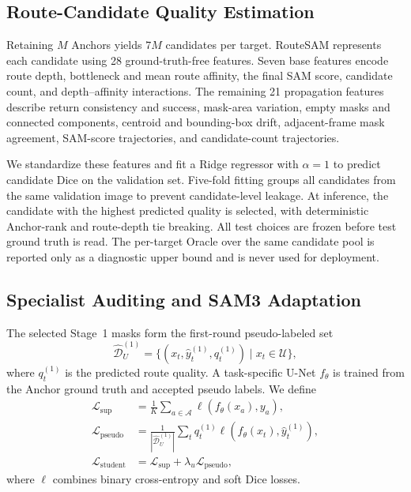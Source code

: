 \documentclass[a4paper,fleqn]{cas-dc}
\begin{document}
\subsection{Route-Candidate Quality Estimation}\label{sec:router}

Retaining $M$ Anchors yields $7M$ candidates per target. RouteSAM represents each candidate using 28 ground-truth-free features. Seven base features encode route depth, bottleneck and mean route affinity, the final SAM score, candidate count, and depth--affinity interactions. The remaining 21 propagation features describe return consistency and success, mask-area variation, empty masks and connected components, centroid and bounding-box drift, adjacent-frame mask agreement, SAM-score trajectories, and candidate-count trajectories.

We standardize these features and fit a Ridge regressor with $\alpha=1$ to predict candidate Dice on the validation set. Five-fold fitting groups all candidates from the same validation image to prevent candidate-level leakage. At inference, the candidate with the highest predicted quality is selected, with deterministic Anchor-rank and route-depth tie breaking. All test choices are frozen before test ground truth is read. The per-target Oracle over the same candidate pool is reported only as a diagnostic upper bound and is never used for deployment.

\subsection{Specialist Auditing and SAM3 Adaptation}\label{sec:collaboration}

The selected Stage~1 masks form the first-round pseudo-labeled set
\begin{equation}
\widehat{\mathcal{D}}_{U}^{(1)}=\{(x_t,\hat{y}_t^{(1)},q_t^{(1)})\mid x_t\in\mathcal{U}\},
\end{equation}
where $q_t^{(1)}$ is the predicted route quality. A task-specific U-Net $f_{\theta}$ is trained from the Anchor ground truth and accepted pseudo labels. We define
\begin{equation}
\begin{aligned}
\mathcal{L}_{\mathrm{sup}}&=\frac{1}{K}\sum_{a\in\mathcal{A}}
\ell(f_{\theta}(x_a),y_a),\\
\mathcal{L}_{\mathrm{pseudo}}&=\frac{1}{|\widehat{\mathcal{D}}_{U}^{(1)}|}
\sum_t q_t^{(1)}\ell(f_{\theta}(x_t),\hat{y}_t^{(1)}),\\
\mathcal{L}_{\mathrm{student}}&=\mathcal{L}_{\mathrm{sup}}
+\lambda_u\mathcal{L}_{\mathrm{pseudo}},
\end{aligned}
\end{equation}
where $\ell$ combines binary cross-entropy and soft Dice losses.
\end{document}
